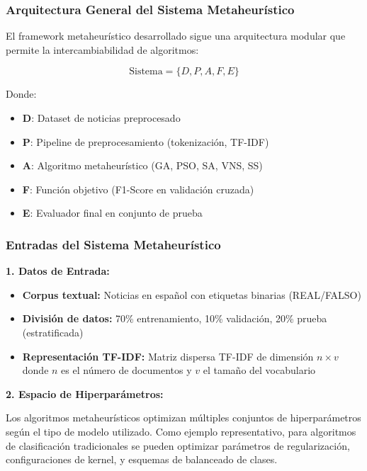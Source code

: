 \subsubsection{Arquitectura General del Sistema Metaheurístico}

El framework metaheurístico desarrollado sigue una arquitectura modular que permite la intercambiabilidad de algoritmos:

\begin{equation}
\text{Sistema} = \{D, P, A, F, E\}
\end{equation}

Donde:
\begin{itemize}
    \item \textbf{D}: Dataset de noticias preprocesado
    \item \textbf{P}: Pipeline de preprocesamiento (tokenización, TF-IDF)
    \item \textbf{A}: Algoritmo metaheurístico (GA, PSO, SA, VNS, SS)
    \item \textbf{F}: Función objetivo (F1-Score en validación cruzada)
    \item \textbf{E}: Evaluador final en conjunto de prueba
\end{itemize}

\subsubsection{Entradas del Sistema Metaheurístico}

\textbf{1. Datos de Entrada:}
\begin{itemize}
    \item \textbf{Corpus textual:} Noticias en español con etiquetas binarias (REAL/FALSO)
    \item \textbf{División de datos:} 70\% entrenamiento, 10\% validación, 20\% prueba (estratificada)
    \item \textbf{Representación TF-IDF:} Matriz dispersa TF-IDF de dimensión $n \times v$ donde $n$ es el número de documentos y $v$ el tamaño del vocabulario
\end{itemize}

\textbf{2. Espacio de Hiperparámetros:}

Los algoritmos metaheurísticos optimizan múltiples conjuntos de hiperparámetros según el tipo de modelo utilizado. Como ejemplo representativo, para algoritmos de clasificación tradicionales se pueden optimizar parámetros de regularización, configuraciones de kernel, y esquemas de balanceado de clases.

